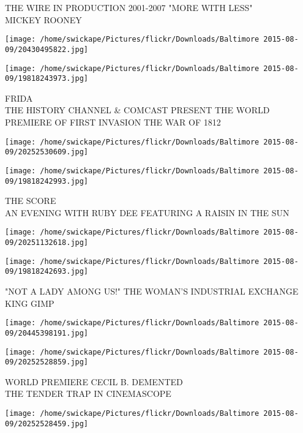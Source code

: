 \documentclass[10pt,letterpaper]{article}
\begin{document}
THE WIRE IN PRODUCTION 2001{-}2007 "MORE WITH LESS"\\
MICKEY ROONEY\\
\pagebreak

\texttt{[image: /home/swickape/Pictures/flickr/Downloads/Baltimore 2015-08-09/20430495822.jpg]}

\vspace{0.25in}
\texttt{[image: /home/swickape/Pictures/flickr/Downloads/Baltimore 2015-08-09/19818243973.jpg]}

FRIDA\\
THE HISTORY CHANNEL \& COMCAST PRESENT THE WORLD PREMIERE OF FIRST INVASION THE WAR OF 1812\\
\pagebreak

\texttt{[image: /home/swickape/Pictures/flickr/Downloads/Baltimore 2015-08-09/20252530609.jpg]}

\vspace{0.25in}
\texttt{[image: /home/swickape/Pictures/flickr/Downloads/Baltimore 2015-08-09/19818242993.jpg]}

THE SCORE\\
AN EVENING WITH RUBY DEE FEATURING A RAISIN IN THE SUN\\
\pagebreak

\texttt{[image: /home/swickape/Pictures/flickr/Downloads/Baltimore 2015-08-09/20251132618.jpg]}

\vspace{0.25in}
\texttt{[image: /home/swickape/Pictures/flickr/Downloads/Baltimore 2015-08-09/19818242693.jpg]}

"NOT A LADY AMONG US!" THE WOMAN'S INDUSTRIAL EXCHANGE\\
KING GIMP\\
\pagebreak

\texttt{[image: /home/swickape/Pictures/flickr/Downloads/Baltimore 2015-08-09/20445398191.jpg]}

\vspace{0.25in}
\texttt{[image: /home/swickape/Pictures/flickr/Downloads/Baltimore 2015-08-09/20252528859.jpg]}

WORLD PREMIERE CECIL B. DEMENTED\\
THE TENDER TRAP IN CINEMASCOPE\\
\pagebreak

\texttt{[image: /home/swickape/Pictures/flickr/Downloads/Baltimore 2015-08-09/20252528459.jpg]}
\end{document}
